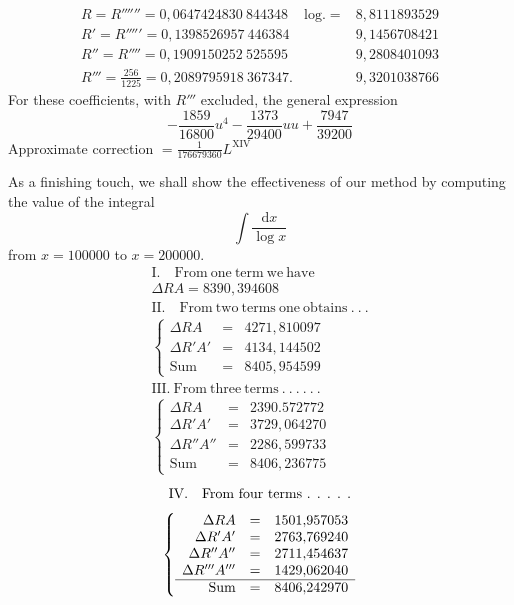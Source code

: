 \[
\begin{array}{lll}
R=R''''''=0{,}0647424830\ 844348&\mathrm{log.}=&8{,}8111893529\\
R'=R'''''=0{,}1398526957\ 446384&&9{,}1456708421\\
R''=R''''=0{,}1909150252\ 525595&&9{,}2808401093\\
R'''=\frac{256}{1225}=0{,}2089795918\ 367347.&&9{,}3201038766
\end{array}
\]
\noindent For these coefficients, with \(R'''\) excluded, the general expression
\[
-\frac{1859}{16800}u^4-\frac{1373}{29400}uu+\frac{7947}{39200}
\]
\noindent Approximate correction \(=\frac{1}{176679360}L^{\mathrm{XIV}}\)

As a finishing touch, we shall show the effectiveness of our method by computing the value of the integral
\[
\int\frac{\mathrm{d}x}{\log x}
\]
from \(x=100000\) to \(x=200000\).
\[
\begin{array}{l}
\mathrm{I.\quad From\ one\ term\ we\ have}\\[3pt]\Delta RA=8390{,}394608\\[6pt]
\mathrm{II.\quad From\ two\ terms\ one\ obtains}\ .\ .\ .\\[3pt]
\left\{\begin{array}{rcl}
\Delta RA&=&4271{,}810097\\
\Delta R'A'&=&4134{,}144502\\\hline
\mathrm{Sum}&=&8405{,}954599
\end{array}\right.\\[8pt]
\mathrm{III.\ From\ three\ terms}\ .\ .\ .\ .\ .\ .\\[3pt]
\left\{\begin{array}{rcl}
\Delta RA&=&2390.572772\\
\Delta R'A'&=&3729{,}064270\\
\Delta R''A''&=&2286{,}599733\\\hline
\mathrm{Sum}&=&8406{,}236775
\end{array}\right.
\end{array}
\]
\endgroup
{}
\[
\begin{gathered}\mbox{IV.\quad From four terms . . . . .}\\[3pt]
\left\{\begin{array}{rcl}
\Delta RA&=&1501{,}957053\\
\Delta R'A'&=&2763{,}769240\\
\Delta R''A''&=&2711{,}454637\\
\Delta R'''A'''&=&1429{,}062040\\ \hline
\mbox{Sum}&=&8406{,}242970
\end{array}\right.\end{gathered}
\]
